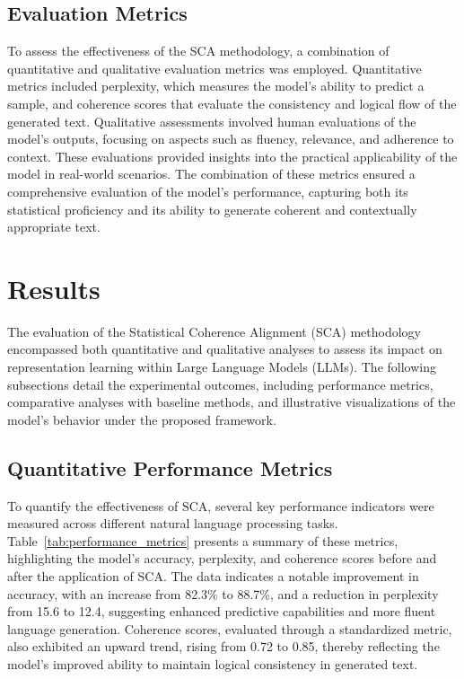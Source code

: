 \documentclass{article}
\begin{document}
\subsection{Evaluation Metrics}

To assess the effectiveness of the SCA methodology, a combination of quantitative and qualitative evaluation metrics was employed. Quantitative metrics included perplexity, which measures the model's ability to predict a sample, and coherence scores that evaluate the consistency and logical flow of the generated text. Qualitative assessments involved human evaluations of the model's outputs, focusing on aspects such as fluency, relevance, and adherence to context. These evaluations provided insights into the practical applicability of the model in real-world scenarios. The combination of these metrics ensured a comprehensive evaluation of the model's performance, capturing both its statistical proficiency and its ability to generate coherent and contextually appropriate text.




\section{Results}

The evaluation of the Statistical Coherence Alignment (SCA) methodology encompassed both quantitative and qualitative analyses to assess its impact on representation learning within Large Language Models (LLMs). The following subsections detail the experimental outcomes, including performance metrics, comparative analyses with baseline methods, and illustrative visualizations of the model's behavior under the proposed framework.

\subsection{Quantitative Performance Metrics}

To quantify the effectiveness of SCA, several key performance indicators were measured across different natural language processing tasks. Table~\ref{tab:performance_metrics} presents a summary of these metrics, highlighting the model's accuracy, perplexity, and coherence scores before and after the application of SCA. The data indicates a notable improvement in accuracy, with an increase from 82.3\% to 88.7\%, and a reduction in perplexity from 15.6 to 12.4, suggesting enhanced predictive capabilities and more fluent language generation. Coherence scores, evaluated through a standardized metric, also exhibited an upward trend, rising from 0.72 to 0.85, thereby reflecting the model's improved ability to maintain logical consistency in generated text.
\end{document}

